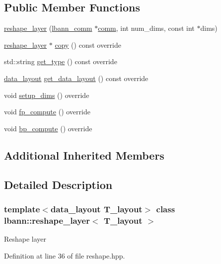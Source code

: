 \subsection*{Public Member Functions}
\begin{DoxyCompactItemize}
\item 
\hyperlink{classlbann_1_1reshape__layer_a6161e3231e7a120bdfc0739eac08d196}{reshape\+\_\+layer} (\hyperlink{classlbann_1_1lbann__comm}{lbann\+\_\+comm} $\ast$\hyperlink{file__io_8cpp_ab048c6f9fcbcfaa57ce68b00263dbebe}{comm}, int num\+\_\+dims, const int $\ast$dims)
\item 
\hyperlink{classlbann_1_1reshape__layer}{reshape\+\_\+layer} $\ast$ \hyperlink{classlbann_1_1reshape__layer_a41685576d72830e400c31536d1d5bab2}{copy} () const override
\item 
std\+::string \hyperlink{classlbann_1_1reshape__layer_af8ed6ed2bb208478ec7a339ee58e0aa6}{get\+\_\+type} () const override
\item 
\hyperlink{base_8hpp_a786677cbfb3f5677b4d84f3056eb08db}{data\+\_\+layout} \hyperlink{classlbann_1_1reshape__layer_a5c3b5585fd6242de0630e643a4dfd992}{get\+\_\+data\+\_\+layout} () const override
\item 
void \hyperlink{classlbann_1_1reshape__layer_a60fd29f11e62137a0808ffe4b3730344}{setup\+\_\+dims} () override
\item 
void \hyperlink{classlbann_1_1reshape__layer_a6a8567b61a1f911f52419ecd2346fcac}{fp\+\_\+compute} () override
\item 
void \hyperlink{classlbann_1_1reshape__layer_a31d90673a9d98ccba0eafb4bf76cbe20}{bp\+\_\+compute} () override
\end{DoxyCompactItemize}
\subsection*{Additional Inherited Members}


\subsection{Detailed Description}
\subsubsection*{template$<$data\+\_\+layout T\+\_\+layout$>$\newline
class lbann\+::reshape\+\_\+layer$<$ T\+\_\+layout $>$}

Reshape layer 

Definition at line 36 of file reshape.\+hpp.



